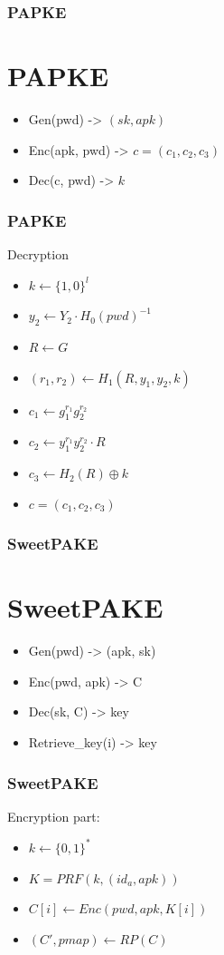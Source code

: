 \documentclass[9pt]{beamer}
\begin{document}
\begin{frame}
\frametitle{PAPKE}
\section{PAPKE}
	\begin{itemize}
	\item Gen(pwd) -> \((sk, apk)\)
	\item Enc(apk, pwd) -> \(c = (c_1, c_2, c_3)\)
	\item Dec(c, pwd) -> \(k\)
	\end{itemize}
\end{frame}

\begin{frame}
\frametitle{PAPKE}
Decryption
\begin{itemize}
	\item \(k \leftarrow \{1,0\}^l\)
	\item \(y_2 \leftarrow Y_2 \cdot H_0(pwd)^{-1}\)
	\item \(R \leftarrow G\)
	\item \((r_1, r_2) \leftarrow H_1(R, y_1, y_2, k)\)
	\item \(c_1 \leftarrow g_1^{r_1} g_2^{r_2}\)
	\item \(c_2 \leftarrow y_1^{r_1} y_2^{r_2} \cdot R\)
	\item \(c_3 \leftarrow H_2(R) \oplus k\)
	\item \(c = (c_1, c_2, c_3)\)
\end{itemize}
\end{frame}

\begin{frame}
\frametitle{SweetPAKE}
\section{SweetPAKE}
\begin{itemize}
	\item Gen(pwd) -> (apk, sk)
	\item Enc(pwd, apk) -> C
	\item Dec(sk, C) -> key
	\item Retrieve\_key(i) -> key
\end{itemize}
\end{frame}

\begin{frame}
\frametitle{SweetPAKE}
Encryption part: 
\begin{itemize}
\item \(k \leftarrow \{0,1\}^*\)
\item \(K = PRF(k, (id_a, apk))\)
\item \(C[i] \leftarrow Enc(pwd, apk, K[i])\)
\item \((C', pmap) \leftarrow RP(C)\)
\end{itemize}
\end{frame}
\end{document}

